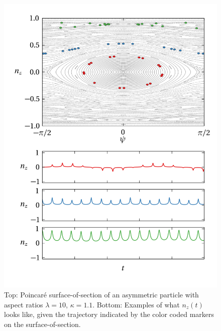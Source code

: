 \documentclass[thesis.tex]{subfiles}
\begin{document}
\begin{figure}
\includegraphics[width=12cm]{figs/poincareB.png}%
\caption{\label{fig:poincareB} Top: Poincar\'e surface-of-section of an asymmetric particle with aspect ratios $\lambda=10$, $\kappa=1.1$. Bottom: Examples of what $n_z(t)$ looks like, given the trajectory indicated by the color coded markers on the surface-of-section. }%
\end{figure}
\end{document}
